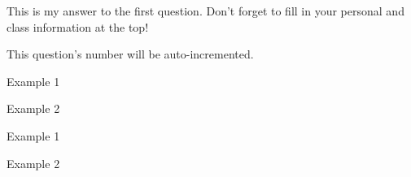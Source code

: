 \documentclass[11pt,largemargins]{homework}
\begin{document}
\maketitle

\question%

This is my answer to the first question.
Don't forget to fill in your personal and class information at the top!

\question%

This question's number will be auto-incremented.

\lipsum[2]


\lipsum[3]


\begin{induction}
    \basecase%
    \indhyp%
    \indstep%
\end{induction}


\begin{arabicparts}
    \item Example 1
    \item Example 2
\end{arabicparts}


\begin{alphaparts}
    \item Example 1
    \item Example 2
\end{alphaparts}

\renewcommand{\questiontype}{Task\ }
\question%

\renewcommand{\questiontype}{Question\ }

\setcounter{section}{42}
\question%
\end{document}
